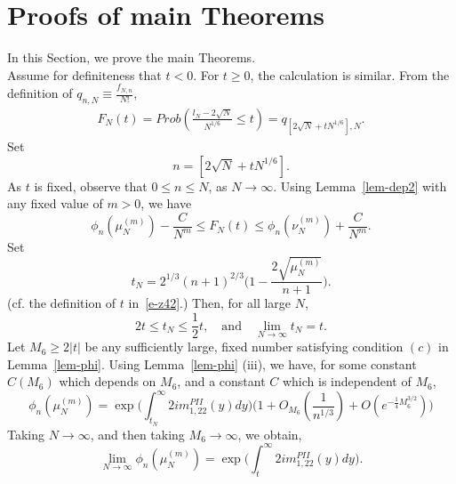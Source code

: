 \documentclass{amsart}
\theoremstyle{definition}
\theoremstyle{remark}
\numberwithin{equation}{section}
\begin{document}

\bigskip
\section{{\bf Proofs of main Theorems}}
\label{s-pf}

In this Section, we prove the main Theorems.\\

  Assume for definiteness that $t<0$. 
For $t\geq 0$, the calculation is similar.
  From the definition of $q_{n,N}\equiv \frac{f_{N,n}}{N!}$, 
\begin{equation}\label{e-ind2}
  \begin{split}
F_N(t)=Prob (\frac{l_N-2\sqrt{N}}{N^{1/6}}\le t)
    =q_{[2\sqrt{N}+tN^{1/6}],N}.
  \end{split}
\end{equation}
Set 
\begin{equation*}
   n=[2\sqrt{N}+tN^{1/6}].
\end{equation*}
As $t$ is fixed, observe that $0\le n\le N$, as $N\to\infty$.
Using Lemma~\ref{lem-dep2} with any fixed value of $m>0$, we have
\begin{equation*}
   \phi_n(\mu_N^{(m)})-\frac{C}{N^m} \le F_N(t)
\le \phi_n(\nu_N^{(m)})+\frac{C}{N^m}.
\end{equation*}
Set 
\begin{equation*}
   t_N=2^{1/3}(n+1)^{2/3}\bigl(1-\frac{2\sqrt{\mu_N^{(m)}}}{n+1}\bigr).
\end{equation*}
(cf. the definition of $t$ in~\eqref{e-z42}.)
Then, for all large $N$, 
\begin{equation*}
   2t\le t_N \le\frac12 t, \quad\text{and}\quad \lim_{N\to\infty}t_N=t.
\end{equation*}
Let $M_6\geq 2|t|$ be any sufficiently large, fixed number satisfying 
condition $(c)$ in Lemma~\ref{lem-phi}. 
Using Lemma~\ref{lem-phi} (iii), we have, for some constant 
$C(M_6)$ which depends on $M_6$, and a constant $C$ which is 
independent of $M_6$, 
\begin{equation*}
   \phi_n(\mu_N^{(m)})=\exp\biggl(\int_{t_N}^{\infty} 
2im^{PII}_{1,22}(y) dy\biggr)
\bigl(1+O_{M_6}(\frac{1}{n^{1/3}})+O(e^{-\frac14M_6^{3/2}})\bigr)
\end{equation*}
Taking $N\to\infty$, and then taking $M_6\to\infty$, we obtain, 
\begin{equation*}
   \lim_{N\to\infty} \phi_n(\mu_N^{(m)})=
\exp\biggl(\int_{t}^{\infty} 2im^{PII}_{1,22}(y) dy\biggr).
\end{equation*}
\end{document}
